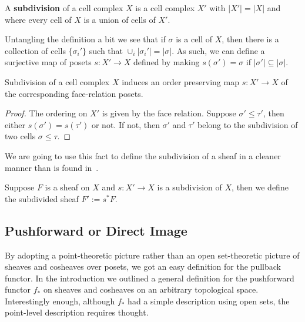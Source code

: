 \begin{defn}
 A \textbf{subdivision} of a cell complex $X$ is a cell complex $X'$ with $|X'|=|X|$ and where every cell of $X$ is a union of cells of $X'$.
\end{defn}

Untangling the definition a bit we see that if $\sigma$ is a cell of $X$, then there is a collection of cells $\{\sigma_i'\}$ such that $\cup_i |\sigma_i'|=|\sigma|$. As such, we can define a surjective map of posets $s:X'\to X$ defined by making $s(\sigma')=\sigma$ if $|\sigma'|\subseteq |\sigma|$.

\begin{clm}
 Subdivision of a cell complex $X$ induces an order preserving map $s:X'\to X$ of the corresponding face-relation posets.
\end{clm}
\begin{proof}
 The ordering on $X'$ is given by the face relation. Suppose $\sigma'\leq \tau'$, then either $s(\sigma')=s(\tau')$ or not. If not, then $\sigma'$ and $\tau'$ belong to the subdivision of two cells $\sigma\leq \tau$.
\end{proof}

We are going to use this fact to define the subdivision of a sheaf in a cleaner manner than is found in~\cite{shepard}.

\begin{defn}
 Suppose $F$ is a sheaf on $X$ and $s:X'\to X$ is a subdivision of $X$, then we define the subdivided sheaf $F':=s^*F$.
\end{defn}

\subsection{Pushforward or Direct Image}
\label{subsubsec:pushforward}

By adopting a point-theoretic picture rather than an open set-theoretic picture of sheaves and cosheaves over posets, we got an easy definition for the pullback functor. In the introduction we outlined a general definition for the pushforward functor $f_*$ on sheaves and cosheaves on an arbitrary topological space. Interestingly enough, although $f_*$ had a simple description using open sets, the point-level description requires thought.


